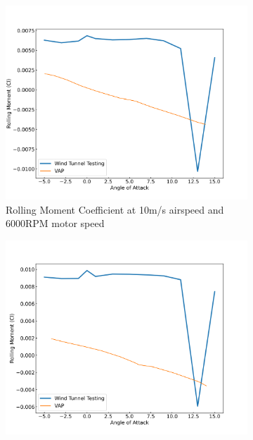 \begin{figure}[H]
    \centering
    \begin{subfigure}[b]{0.467\textwidth}
        \centering
        \includegraphics[width=\textwidth]{05_Results/VAP/pusher/Cl/10ms_6000RPM_Cl.png}
        \caption{Rolling Moment Coefficient at 10m/s airspeed and 6000RPM motor speed}
        \label{fig:VAP_pusher_Cl_10ms_6000}
    \end{subfigure}
    \begin{subfigure}[b]{0.467\textwidth}
        \centering
        \includegraphics[width=\textwidth]{05_Results/VAP/pusher/Cl/10ms_11000RPM_Cl.png}

\end{subfigure}
\end{figure}
